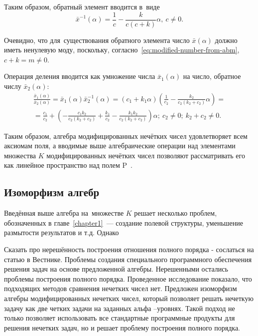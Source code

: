 Таким образом, обратный элемент вводится в~виде
\begin{equation}
\label{eq:modified-inverse-division}
  \bar{x}^{-1}(\alpha )=\frac{1}{c}-\frac{k}{c\left(c+k\right)}\alpha,\ c\ne 0.
\end{equation}

Очевидно, что для~существования обратного элемента число $\bar{x}\left( \alpha  \right)$ должно иметь ненулевую моду, поскольку, согласно~\eqref{eq:modified-number-from-abm}, $c+k=m\ne 0$.

Операция деления вводится как умножение числа $\bar{x}_1\left( \alpha  \right)$ на число, обратное числу $\bar{x}_2\left( \alpha  \right)$:
\begin{gather*}
  \frac{\bar{x}_1\left( \alpha \right)}{\bar{x}_2\left( \alpha  \right)}=\bar{x}_1\left( \alpha  \right)\bar{x}_{2}^{-1}\left( \alpha \right)=\left( c_1+k_1\alpha  \right)\left( \frac{1}{c_2}-\frac{k_2}{c_2\left( k_2+c_2 \right)}\alpha \right)={} \\ 
  {}=\frac{c_1}{c_2}+\left( -\frac{c_1k_2}{c_2\left( k_2+c_2 \right)}+\frac{k_1}{c_2}-\frac{k_1k_2}{c_2\left( k_2+c_2 \right)} \right)\alpha;\ c_2\ne 0;\ k_2+c_2\ne 0.
\end{gather*}

Таким образом, алгебра модифицированных нечётких чисел удовлетворяет всем аксиомам поля, а вводимые выше алгебраические операции над элементами множества $K$ модифицированных нечётких чисел позволяют рассматривать его как линейное пространство над полем P~\cite{Voevodin}.

\subsection{Изоморфизм алгебр}

Введённая выше алгебра на~множестве $K$ решает несколько проблем, обозначенных в главе~\ref{chapter1}~--- создание полевой структуры, уменьшение размытости результатов и т.д. Однако

Сказать про нерешённость построения отношения полного порядка - сослаться на статью в Вестнике.
Проблемы создания специального программного обеспечения решения задач на основе предложенной алгебры. Нерешенными остались проблемы построения полного порядка. Проведенное исследование показало, что подходящих методов сравнения нечетких чисел нет.
Предложен изоморфизм алгебры модифицированных нечетких чисел, который позволяет решать нечеткую задачу как две четких задачи на заданных альфа –уровнях.
Такой подход не только позволяет использовать все стандартные программные продукты для решения нечетких задач, но и решает проблему построения полного порядка.


